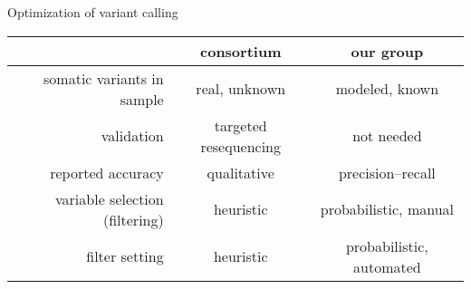 \documentclass{beamer}
\begin{document}
\begin{frame}{Optimization of variant calling}
\small
\begin{tabular}{r|cc}
& consortium & our group \\
\hline
somatic variants in sample & real, unknown & modeled, known \\
validation & targeted resequencing & not needed \\
reported accuracy & qualitative & precision--recall \\
variable selection (filtering) & heuristic & probabilistic, manual \\
filter setting & heuristic & probabilistic, automated \\
\end{tabular}
\end{frame}
\end{document}
